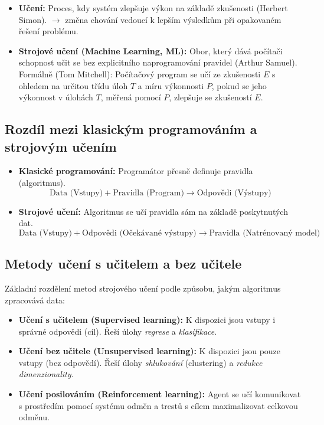 \begin{itemize}
    \item \textbf{Učení:} Proces, kdy systém zlepšuje výkon na základě zkušenosti (Herbert Simon). $\to$ změna chování vedoucí k lepším výsledkům při opakovaném řešení problému.
    \item \textbf{Strojové učení (Machine Learning, ML):} Obor, který dává počítači schopnost učit se bez explicitního naprogramování pravidel (Arthur Samuel). Formálně (Tom Mitchell): Počítačový program se učí ze zkušenosti $E$ s ohledem na určitou třídu úloh $T$ a míru výkonnosti $P$, pokud se jeho výkonnost v úlohách $T$, měřená pomocí $P$, zlepšuje se zkušeností $E$.
\end{itemize}

\subsection{Rozdíl mezi klasickým programováním a strojovým učením}
\begin{itemize}
    \item \textbf{Klasické programování:} Programátor přesně definuje pravidla (algoritmus). 
    \[ \text{Data (Vstupy)} + \text{Pravidla (Program)} \longrightarrow \text{Odpovědi (Výstupy)} \]
    \item \textbf{Strojové učení:} Algoritmus se učí pravidla sám na základě poskytnutých dat.
    \[ \text{Data (Vstupy)} + \text{Odpovědi (Očekávané výstupy)} \longrightarrow \text{Pravidla (Natrénovaný model)} \]
\end{itemize}

\subsection{Metody učení s učitelem a bez učitele}
Základní rozdělení metod strojového učení podle způsobu, jakým algoritmus zpracovává data:
\begin{itemize}
    \item \textbf{Učení s učitelem (Supervised learning):} K dispozici jsou vstupy i správné odpovědi (cíl). Řeší úlohy \textit{regrese} a \textit{klasifikace}.
    \item \textbf{Učení bez učitele (Unsupervised learning):} K dispozici jsou pouze vstupy (bez odpovědí). Řeší úlohy \textit{shlukování} (clustering) a \textit{redukce dimenzionality}.
    \item \textbf{Učení posilováním (Reinforcement learning):} Agent se učí komunikovat s prostředím pomocí systému odměn a trestů s cílem maximalizovat celkovou odměnu.
\end{itemize}

